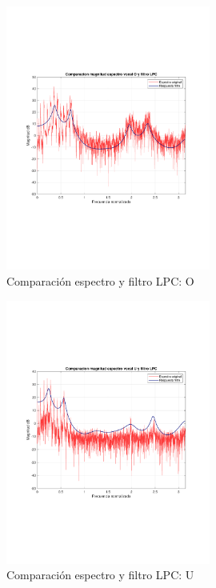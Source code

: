 	\begin{figure}[H]
		\center
		\includegraphics[width=0.6\textwidth,clip, trim = {1.9cm 6.8cm 2.3cm 7cm}]{../plots/O_lpc.pdf}
		\caption{Comparación espectro y filtro LPC: O}
		\label{fig:LPC_O}
	\end{figure}

	\begin{figure}[H]
		\center
		\includegraphics[width=0.6\textwidth,clip, trim = {1.9cm 6.8cm 2.3cm 7cm}]{../plots/U_lpc.pdf}
		\caption{Comparación espectro y filtro LPC: U}
		\label{fig:LPC_U}
	\end{figure}
	
